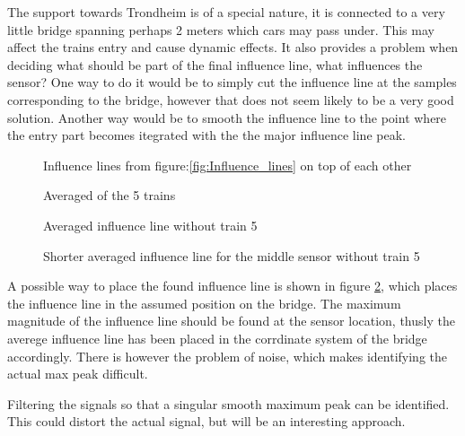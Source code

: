 The support towards Trondheim is of a special nature, it is connected to a very little bridge spanning perhaps 2 meters which cars may pass under. This may affect the trains entry and cause dynamic effects. It also provides a problem when deciding what should be part of the final influence line, what influences the sensor?
One way to do it would be to simply cut the influence line at the samples corresponding to the bridge, however that does not seem likely to be a very good solution. Another way would be to smooth the influence line to the point where the entry part becomes itegrated with the the major influence line peak.

\begin{figure}[H]
	\centering
	
	\caption{Influence lines from figure:\ref{fig:Influence_lines} on top of each other}
	\label{fig:infl_all_trains}
\end{figure}

\begin{figure}[H]
	\centering
	
	\caption{Averaged of the 5 trains}
	\label{fig:infl_vec_averaged_wBridge}
\end{figure}

\begin{figure}[H]
	\centering
	
	\caption{Averaged influence line without train 5}
	\label{fig:infl_vec_averaged_wo_train5}
\end{figure}

\begin{figure}[H]
	\centering
	
	\caption{Shorter averaged influence line for the middle sensor without train 5}
	\label{fig:infl_vec_averaged_fft10hz}
\end{figure}

A possible way to place the found influence line is shown in figure \ref{fig:infl_vec_averaged_wBridge}, which places the influence line in the assumed position on the bridge. The maximum magnitude of the influence line should be found at the sensor location, thusly the averege influence line has been placed in the corrdinate system of the bridge accordingly. There is however the problem of noise, which makes identifying the actual max peak difficult.

Filtering the signals so that a singular smooth maximum peak can be identified. This could distort the actual signal, but will be an interesting approach.

